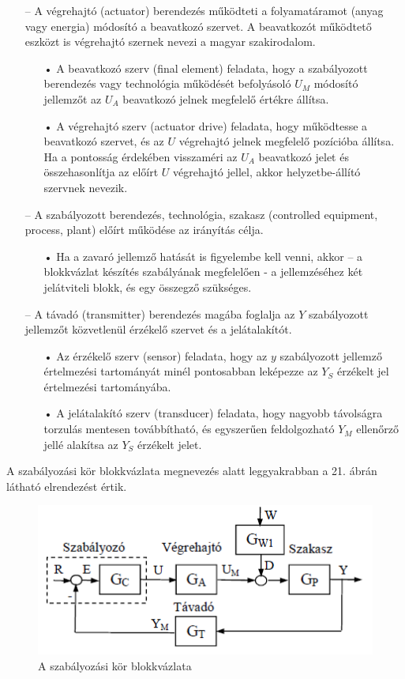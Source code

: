 \documentclass[11pt,a4paper]{article}
\begin{document}
\begin{enumerate}
	\item[--] A végrehajtó (actuator) berendezés működteti a folyamatáramot (anyag vagy energia)
módosító a beavatkozó szervet. A beavatkozót működtető eszközt is végrehajtó
szernek nevezi a magyar szakirodalom.
	\begin{itemize}
		\item[•]A beavatkozó szerv (final element) feladata, hogy a szabályozott berendezés
vagy technológia működését befolyásoló $U_M$ módosító jellemzőt az $U_A$ beavatkozó
jelnek megfelelő értékre állítsa.
\item[•]A végrehajtó szerv (actuator drive) feladata, hogy működtesse a beavatkozó
szervet, és az $U$ végrehajtó jelnek megfelelő pozícióba állítsa. Ha a pontosság
érdekében visszaméri az $U_A$ beavatkozó jelet és összehasonlítja az előírt $U$ végrehajtó
jellel, akkor helyzetbe-állító szervnek nevezik.
	\end{itemize}
	\item[--]A szabályozott berendezés, technológia, szakasz (controlled equipment, process, plant)
előírt működése az irányítás célja.
\begin{itemize}
	\item[•]Ha a zavaró jellemző hatását is figyelembe kell venni, akkor – a blokkvázlat készítés
szabályának megfelelően - a jellemzéséhez két jelátviteli blokk, és egy
összegző szükséges.
\end{itemize}
\item[--]A távadó (transmitter) berendezés magába foglalja az $Y$ szabályozott jellemzőt
közvetlenül érzékelő szervet és a jelátalakítót.
\begin{itemize}
\item[•]Az érzékelő szerv (sensor) feladata, hogy az $y$ szabályozott jellemző értelmezési
tartományát minél pontosabban leképezze az $Y_S$ érzékelt jel értelmezési tartományába.
\item[•]A jelátalakító szerv (transducer) feladata, hogy nagyobb távolságra torzulás mentesen
továbbítható, és egyszerűen feldolgozható $Y_M$ ellenőrző jellé alakítsa az $Y_S$ érzékelt jelet.
\end{itemize}
\end{enumerate}
A szabályozási kör blokkvázlata megnevezés alatt leggyakrabban a 21. ábrán
látható elrendezést értik.
\begin{figure}[hbtp]
    	 \centering
		\includegraphics[scale=1.0]{21_szabalyozas_blokk_II.png}
		\caption{A szabályozási kör blokkvázlata}
\end{figure}
\end{document}
